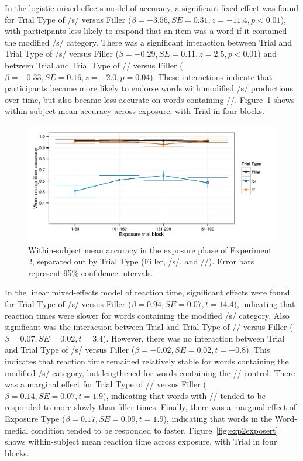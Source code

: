 In the logistic mixed-effects model of accuracy, a significant fixed effect was found for Trial Type of /s/ versus Filler ($\beta = -3.56, SE = 0.31, z = -11.4, p < 0.01$), with participants less likely to respond that an item was a word if it contained the modified /s/ category.
There was a significant interaction between Trial and Trial Type of /s/ versus Filler ($\beta = -0.29, SE = 0.11, z = 2.5, p < 0.01$) and between Trial and Trial Type of /\textesh/ versus Filler ($\beta = -0.33, SE = 0.16, z = -2.0, p = 0.04$).  
These interactions indicate that participants became more likely to endorse words with modified /s/ productions over time, but also became less accurate on words containing /\textesh/.  
Figure~\ref{fig:exp2exposeacc} shows within-subject mean accuracy across exposure, with Trial in four blocks.


\begin{figure}[!ht]
\caption{Within-subject mean accuracy in the exposure phase of Experiment 2, separated out by Trial Type (Filler, /s/, and /\textesh/). Error bars represent 95\% confidence intervals.}
\label{fig:exp2exposeacc}
\begin{center}
\includegraphics[width=\textwidth]{graphs/exp2_expacc}
\end{center}
\end{figure}

In the linear mixed-effects model of reaction time, significant effects were found for Trial Type of /s/ versus Filler ($\beta = 0.94, SE = 0.07, t = 14.4$), indicating that reaction times were slower for words containing the modified /s/ category.
Also significant was the interaction between Trial and Trial Type of /\textesh/ versus Filler ($\beta = 0.07, SE = 0.02, t = 3.4$).
However, there was no interaction between Trial and Trial Type of /s/ versus Filler ($\beta = -0.02, SE = 0.02, t = -0.8$). 
This indicates that reaction time remained relatively stable for words containing the modified /s/ category, but lengthened for words containing the /\textesh/ control.  
There was a marginal effect for Trial Type of /\textesh/ versus Filler ($\beta = 0.14, SE = 0.07, t = 1.9$), indicating that words with /\textesh/ tended to be responded to more slowly than filler times.
Finally, there was a marginal effect of Exposure Type ($\beta = 0.17, SE = 0.09, t = 1.9$), indicating that words in the Word-medial condition tended to be responded to faster.
Figure~\ref{fig:exp2exposert} shows within-subject mean reaction time across exposure, with Trial in four blocks.

